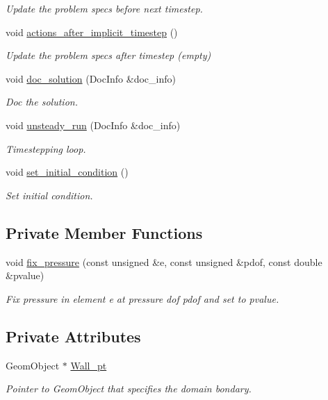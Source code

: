 \begin{DoxyCompactItemize}
\begin{DoxyCompactList}\small\item\em Update the problem specs before next timestep. \end{DoxyCompactList}\item 
void \hyperlink{classOscEllipseProblem_a80b50009a6aba4b6920c11b86b06f0f9}{actions\+\_\+after\+\_\+implicit\+\_\+timestep} ()
\begin{DoxyCompactList}\small\item\em Update the problem specs after timestep (empty) \end{DoxyCompactList}\item 
void \hyperlink{classOscEllipseProblem_afca2cc3e3e64ac764323f232cacc7e3b}{doc\+\_\+solution} (Doc\+Info \&doc\+\_\+info)
\begin{DoxyCompactList}\small\item\em Doc the solution. \end{DoxyCompactList}\item 
void \hyperlink{classOscEllipseProblem_ad0d879edbbd8b09b61e802ab66ef98a3}{unsteady\+\_\+run} (Doc\+Info \&doc\+\_\+info)
\begin{DoxyCompactList}\small\item\em Timestepping loop. \end{DoxyCompactList}\item 
void \hyperlink{classOscEllipseProblem_ae638f238a7b0e0acb5d6087b7363fe01}{set\+\_\+initial\+\_\+condition} ()
\begin{DoxyCompactList}\small\item\em Set initial condition. \end{DoxyCompactList}\end{DoxyCompactItemize}
\subsection*{Private Member Functions}
\begin{DoxyCompactItemize}
\item 
void \hyperlink{classOscEllipseProblem_a8b70831d1c25a40c814d5d92e77a1085}{fix\+\_\+pressure} (const unsigned \&e, const unsigned \&pdof, const double \&pvalue)
\begin{DoxyCompactList}\small\item\em Fix pressure in element e at pressure dof pdof and set to pvalue. \end{DoxyCompactList}\end{DoxyCompactItemize}
\subsection*{Private Attributes}
\begin{DoxyCompactItemize}
\item 
Geom\+Object $\ast$ \hyperlink{classOscEllipseProblem_a7d33f6345bf94cfe5165c4b9f2064ee6}{Wall\+\_\+pt}
\begin{DoxyCompactList}\small\item\em Pointer to Geom\+Object that specifies the domain bondary. \end{DoxyCompactList}\end{DoxyCompactItemize}


